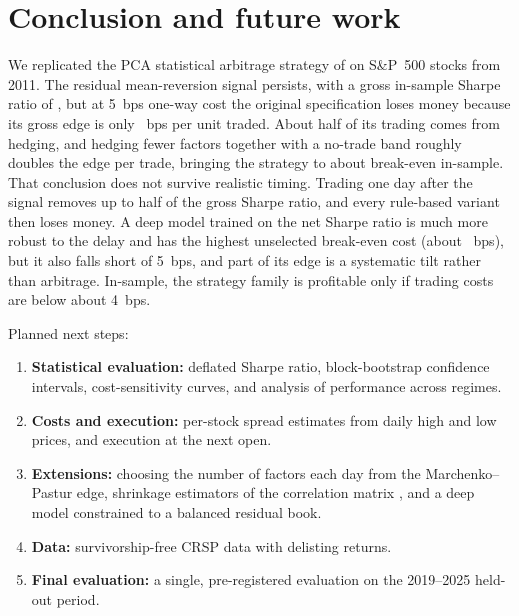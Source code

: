 \section{Conclusion and future work}
\label{sec:conclusion}

We replicated the PCA statistical arbitrage strategy of \citet{avellaneda2010} on S\&P~500
stocks from 2011. The residual mean-reversion signal persists, with a gross in-sample Sharpe
ratio of \BaseGrossSR{}, but at 5~bps one-way cost the original specification loses money
because its gross edge is only \BaseBreakeven{}~bps per unit traded. About half of its trading
comes from hedging, and hedging fewer factors together with a no-trade band roughly doubles the
edge per trade, bringing the strategy to about break-even in-sample. That conclusion does not
survive realistic timing. Trading one day after the signal removes up to half of the gross Sharpe
ratio, and every rule-based variant then loses money. A deep model trained on the net Sharpe
ratio is much more robust to the delay and has the highest unselected break-even cost (about
\DeepLagBE~bps), but it also falls short of 5~bps, and part of its edge is a systematic tilt
rather than arbitrage. In-sample, the strategy family is profitable only if trading costs are
below about 4~bps.

Planned next steps:
\begin{enumerate}
  \item \textbf{Statistical evaluation:} deflated Sharpe ratio, block-bootstrap confidence
        intervals, cost-sensitivity curves, and analysis of performance across regimes.
  \item \textbf{Costs and execution:} per-stock spread estimates from daily high and low prices,
        and execution at the next open.
  \item \textbf{Extensions:} choosing the number of factors each day from the Marchenko--Pastur
        edge, shrinkage estimators of the correlation matrix \citep{ledoit2004}, and a deep model
        constrained to a balanced residual book.
  \item \textbf{Data:} survivorship-free CRSP data with delisting returns.
  \item \textbf{Final evaluation:} a single, pre-registered evaluation on the 2019--2025 held-out
        period.
\end{enumerate}
